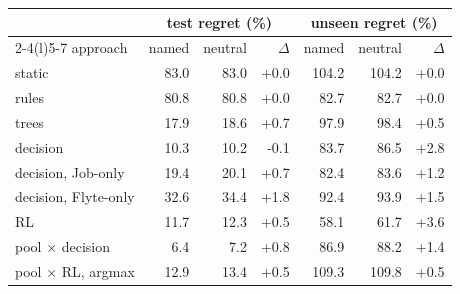 \begin{tabular}{@{}lrrrrrr@{}}
\toprule
& \multicolumn{3}{c}{test regret (\%)} & \multicolumn{3}{c}{unseen regret (\%)} \\
\cmidrule(lr){2-4}\cmidrule(l){5-7}
approach & named & neutral & $\Delta$ & named & neutral & $\Delta$ \\
\midrule
static & 83.0 & 83.0 & +0.0 & 104.2 & 104.2 & +0.0 \\
rules & 80.8 & 80.8 & +0.0 & 82.7 & 82.7 & +0.0 \\
trees & 17.9 & 18.6 & +0.7 & 97.9 & 98.4 & +0.5 \\
decision & 10.3 & 10.2 & -0.1 & 83.7 & 86.5 & +2.8 \\
decision, Job-only & 19.4 & 20.1 & +0.7 & 82.4 & 83.6 & +1.2 \\
decision, Flyte-only & 32.6 & 34.4 & +1.8 & 92.4 & 93.9 & +1.5 \\
RL & 11.7 & 12.3 & +0.5 & 58.1 & 61.7 & +3.6 \\
pool $\times$ decision & 6.4 & 7.2 & +0.8 & 86.9 & 88.2 & +1.4 \\
pool $\times$ RL, argmax & 12.9 & 13.4 & +0.5 & 109.3 & 109.8 & +0.5 \\
\bottomrule
\end{tabular}
